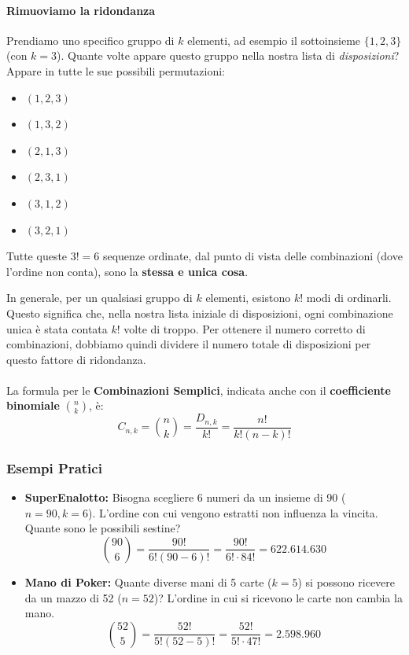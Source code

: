\paragraph{Rimuoviamo la ridondanza}
Prendiamo uno specifico gruppo di $k$ elementi, ad esempio il sottoinsieme $\{1, 2, 3\}$ (con $k=3$). Quante volte appare questo gruppo nella nostra lista di \textit{disposizioni}? Appare in tutte le sue possibili permutazioni:
\begin{itemize}
    \item $(1, 2, 3)$
    \item $(1, 3, 2)$
    \item $(2, 1, 3)$
    \item $(2, 3, 1)$
    \item $(3, 1, 2)$
    \item $(3, 2, 1)$
\end{itemize}
Tutte queste $3! = 6$ sequenze ordinate, dal punto di vista delle combinazioni (dove l'ordine non conta), sono la \textbf{stessa e unica cosa}.

In generale, per un qualsiasi gruppo di $k$ elementi, esistono $k!$ modi di ordinarli. Questo significa che, nella nostra lista iniziale di disposizioni, ogni combinazione unica è stata contata $k!$ volte di troppo. Per ottenere il numero corretto di combinazioni, dobbiamo quindi dividere il numero totale di disposizioni per questo fattore di ridondanza.
\\\\La formula per le \textbf{Combinazioni Semplici}, indicata anche con il \textbf{coefficiente binomiale} $\binom{n}{k}$, è:
\[ C_{n,k} = \binom{n}{k} = \frac{D_{n,k}}{k!} = \frac{n!}{k!(n-k)!} \]

\subsubsection{Esempi Pratici}
\begin{itemize}
    \item \textbf{SuperEnalotto:} Bisogna scegliere 6 numeri da un insieme di 90 ($n=90, k=6$). L'ordine con cui vengono estratti non influenza la vincita. Quante sono le possibili sestine?
    \[ \binom{90}{6} = \frac{90!}{6!(90-6)!} = \frac{90!}{6! \cdot 84!} = 622.614.630 \]
    
    \item \textbf{Mano di Poker:} Quante diverse mani di 5 carte ($k=5$) si possono ricevere da un mazzo di 52 ($n=52$)? L'ordine in cui si ricevono le carte non cambia la mano.
    \[ \binom{52}{5} = \frac{52!}{5!(52-5)!} = \frac{52!}{5! \cdot 47!} = 2.598.960 \]
\end{itemize}

